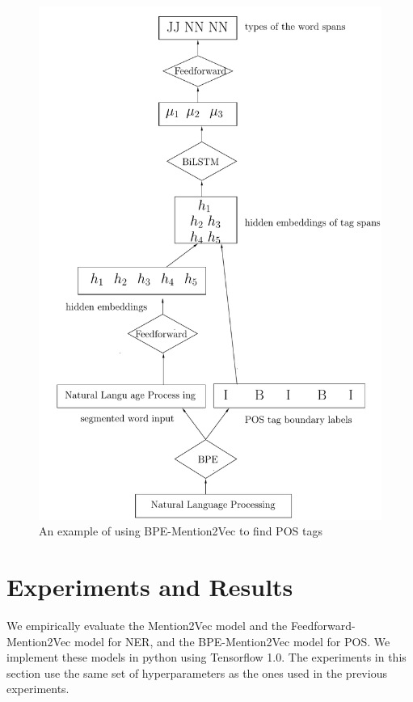 \begin{figure}
  \centering
  \includegraphics[scale=0.6]{bpemention2vec.pdf}
 \caption{An example of using BPE-Mention2Vec to find POS tags}
  \label{fig:bpemention2vec}
\end{figure}

\section{Experiments and Results}

We empirically evaluate the Mention2Vec model and the Feedforward-Mention2Vec model for NER, and the BPE-Mention2Vec model for POS. We implement these models in python using Tensorflow 1.0. The experiments in this section use the same set of hyperparameters as the ones used in the previous experiments. 

